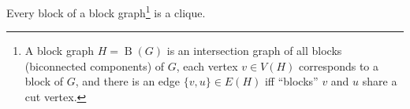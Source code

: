 \documentclass[a4paper,12pt]{article}
\newcommand{\op}[1]{\operatorname*{#1}}
\newcommand{\blockGraph}[1]{\op{B}(#1)}
\begin{document}
\begin{tasks}
    \begin{theorem}[Harary]
        Every block of a block graph\footnote{A block graph $H = \blockGraph{G}$ is an intersection graph of all blocks (biconnected components) of $G$, \ie each vertex $v \in V(H)$ corresponds to a block of $G$, and there is an edge $\{v, u\} \in E(H)$ iff \enquote{blocks} $v$ and $u$ share a cut vertex.} is a clique.
    \end{theorem}

\end{tasks}
\end{document}
